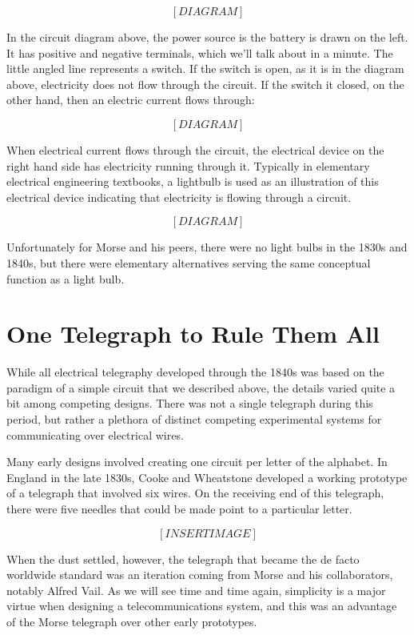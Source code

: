\documentclass{book}
\begin{document}
\[ [DIAGRAM] \]

In the circuit diagram above, the power source is the battery is drawn on the left. It has positive and negative terminals, which we'll talk about in a minute. The little angled line represents a switch. If the switch is open, as it is in the diagram above, electricity does not flow through the circuit. If the switch it closed, on the other hand, then an electric current flows through:

\[ [DIAGRAM] \]

When electrical current flows through the circuit, the electrical device on the right hand side has electricity running through it. Typically in elementary electrical engineering textbooks, a lightbulb is used as an illustration of this electrical device indicating that electricity is flowing through a circuit.

\[ [DIAGRAM] \]

Unfortunately for Morse and his peers, there were no light bulbs in the 1830s and 1840s, but there were elementary alternatives serving the same conceptual function as a light bulb.

\section{One Telegraph to Rule Them All}

While all electrical telegraphy developed through the 1840s was based on the paradigm of a simple circuit that we described above, the details varied quite a bit among competing designs. There was not a single telegraph during this period, but rather a plethora of distinct competing experimental systems for communicating over electrical wires.

Many early designs involved creating one circuit per letter of the alphabet. In England in the late 1830s, Cooke and Wheatstone developed a working prototype of a telegraph that involved six wires. On the receiving end of this telegraph, there were five needles that could be made point to a particular letter.

\[ [INSERT IMAGE] \]

When the dust settled, however, the telegraph that became the de facto worldwide standard was an iteration coming from Morse and his collaborators, notably Alfred Vail. As we will see time and time again, simplicity is a major virtue when designing a telecommunications system, and this was an advantage of the Morse telegraph over other early prototypes.
\end{document}
